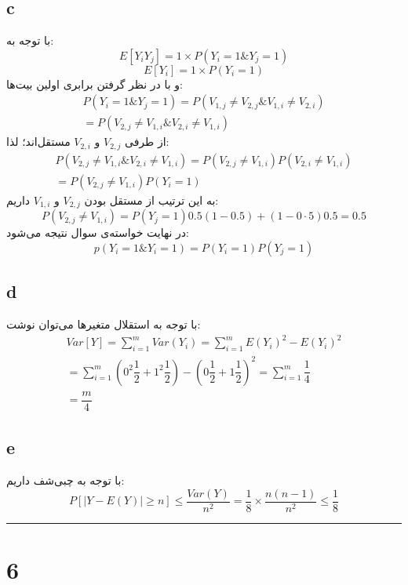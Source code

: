 \documentclass{article}
\begin{document}
\subsection*{c}
با توجه به:
$$E\left[ Y_{i}Y_{j}\right] =1\times P\left( Y_{i}=1\& Y_{j}=1\right)$$
$$E\left[ Y_{i}\right] =1\times P\left( Y_{i}=1\right)$$
و با در نظر گرفتن برابری اولین بیت‌ها:
$$\begin{aligned}P\left( Y_{i}=1\& Y_{j}=1\right) =P\left( V_{1,j}\neq V_{2,j}\& V_{1,i}\neq V_{2,i}\right) \\ =P\left( V_{2,j}\neq V_{1,i}\& V_{2,i}\neq V_{1,i}\right) \end{aligned}$$
از طرفی
$V_{2,j}$
و
$V_{2,i}$
مستقل‌اند؛ لذا:
$$\begin{aligned}P\left( V_{2,j}\neq V_{1,i}\& V_{2,i}\neq V_{1,i}\right) =P\left( V_{2,j}\neq V_{1,i}\right) P\left( V_{2,i}\neq V_{1,i}\right) \\ =P\left( V_{2,j}\neq V_{1,i}\right) P\left( Y_{i}=1\right) \end{aligned}$$
به این ترتیب از مستقل بودن
$V_{2,j}$
و
$V_{1,i}$
داریم:
$$P( V_{2,j}\neq V_{1,i}) = P(Y_j = 1) 0.5\left( 1-0.5\right) +\left( 1-0\cdot 5\right) 0.5=0.5$$
در نهایت خواسته‌ی سوال نتیجه می‌شود:
$$p( Y_{i}=1\& Y_{i}= 1) =P( Y_{i}= 1) P( Y_{j}= 1)$$

\subsection*{d}
با توجه به استقلال متغیرها می‌توان نوشت:
$$\begin{aligned}Var\left[ Y\right] =\sum ^{m}_{i=1}Var\left( Y_{i}\right) =\sum ^{m}_{i=1}E\left( Y_{i}\right) ^{2}-E\left( Y_{i}\right) ^{2}\\ =\sum ^{m}_{i=1}\left( 0^{2}\dfrac{1}{2}+1^{2}\dfrac{1}{2}\right) -\left( 0\dfrac{1}{2}+1\dfrac{1}{2}\right) ^{2}=\sum ^{m}_{i=1}\dfrac{1}{4}\\ =\dfrac{m}{4}\end{aligned}$$

\subsection*{e}
با توجه به چبی‌شف داریم:
$$P[ \left| Y-E\left( Y\right) \right| \geq n] \leq \dfrac{Var\left( Y\right) }{n^{2}}=\dfrac{1}{8}\times \dfrac{n\left( n-1\right) }{n^{2}}\leq \dfrac{1}{8}$$

\rule{\linewidth}{1pt}
\section*{6}
\end{document}

